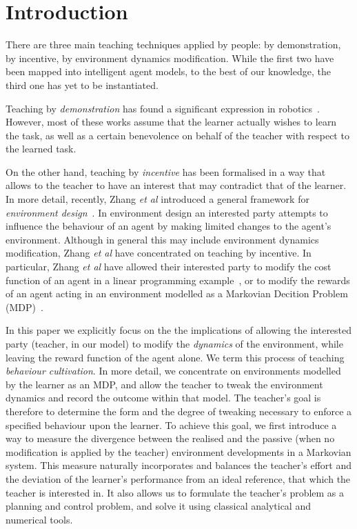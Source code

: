 

\section{Introduction}

There are three main teaching techniques applied by people: by
demonstration, by incentive, by environment dynamics
modification. While the
first two have been mapped into intelligent agent models, to the best
of our knowledge, the third one has yet to be instantiated.

Teaching by {\em demonstration} has found a significant expression in
robotics~\cite{argal_etal_2009}. However, most of these works assume
that the learner actually wishes to learn the task, as well as a
certain benevolence on behalf of the teacher with respect to the
learned task.

On the other hand, teaching by {\em incentive} has been formalised in a way
that allows to the teacher to have an interest that may contradict
that of the learner. In more detail, recently, Zhang \emph{et al}
introduced a general framework for \emph{environment
  design}~\cite{Zhang09:General}. In environment design an interested
party attempts to influence the behaviour of an agent by making limited
changes to the agent's environment. Although in general this may
include environment dynamics modification, Zhang \emph{et al} have
concentrated on teaching by incentive. In particular, Zhang \emph{et
  al} have allowed their interested party to modify the cost function
of an agent in a linear programming example~\cite{Zhang09:General}, or
to modify the rewards of an agent acting in an environment modelled as
a Markovian Decition Problem (MDP)~\cite{zhang_parkes_2008,Zhang09:Policy}.

In this paper we explicitly focus on the the implications of allowing
the interested party (teacher, in our model) to modify the
\emph{dynamics} of the environment, while leaving the reward function
of the agent alone. We term this process of teaching {\em behaviour
  cultivation}. In more detail, we concentrate on environments
modelled by the learner as an MDP, and allow the teacher to tweak the
environment dynamics and record the outcome within that model. The
teacher's goal is therefore to determine the form and the degree of
tweaking necessary to enforce a specified behaviour upon the
learner. To achieve this goal, we first introduce a way to measure the
divergence between the realised and the passive (when no modification
is applied by the teacher) environment developments in a Markovian
system. This measure naturally incorporates and balances the teacher's
effort and the deviation of the learner's performance from an ideal
reference, that which the teacher is interested in. It also allows us
to formulate the teacher's problem as a planning and control problem,
and solve it using classical analytical and numerical tools.

